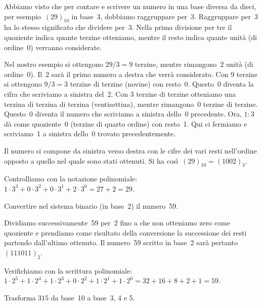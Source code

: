 Abbiamo visto che per contare e scrivere un numero in una base diversa da dieci, per esempio~$(29)_{10}$ in base~3,
dobbiamo raggruppare per~3. Raggruppare per~3 ha lo stesso significato che dividere per~3. Nella
prima divisione per tre il quoziente indica quante terzine otteniamo, mentre il resto indica
quante unità (di ordine~0) verranno considerate.

\begin{multicols}{2}
Nel nostro esempio si ottengono $29/3=9$ terzine,
mentre rimangono~2 unità (di ordine~0). Il~2 sarà il primo numero a destra che verrà considerato. Con 9
terzine si ottengono $9/3=3$ terzine di terzine (novine) con resto~0. Questo~0 diventa la cifra che scriviamo
a sinistra del~2. Con 3 terzine di terzine otteniamo una terzina di terzina di terzina (ventisettina),
mentre rimangono~0 terzine di terzine. Questo~0 diventa il numero che scriviamo a sinistra dello~0 precedente. Ora,
$1:3$ dà come quoziente~0 (terzine di quarto ordine) con resto~1. Qui ci fermiamo e scriviamo~1 a sinistra dello~0
trovato precedentemente.
\begin{center}

\end{center}
\end{multicols}

Il numero si compone da sinistra verso destra con le cifre dei vari resti nell'ordine opposto a quello nel quale sono stati ottenuti. Si ha così~$(29)_{10}=(1002)_{3}$.

Controlliamo con la notazione
polinomiale:~$1\cdot 3^{3}+0\cdot3^{2}+0\cdot 3^{1}+2\cdot 3^{0}=27+2=29$.

\begin{exrig}
\begin{esempio}
Convertire nel sistema binario (in base~2) il numero~59.
\begin{multicols}{2}
Dividiamo successivamente~59 per~2 fino a che non otteniamo zero come
quoziente e prendiamo come risultato della conversione la successione
dei resti partendo dall'ultimo ottenuto.
Il numero~59 scritto in base~2 sarà pertanto~$(111011)_{2}$.

Verifichiamo con la scrittura
polinomiale:~$1\cdot 2^{5}+1\cdot2^{4}+1\cdot 2^{3}+0\cdot 2^{2}+1\cdot 2^{1}+1\cdot2^{0}=32+16+8+2+1=59$.
\begin{center}

\end{center}
\end{multicols}
\end{esempio}

\begin{esempio}
Trasforma $315$ da base~10 a base~3, 4 e 5.


\end{esempio}
\end{exrig}

